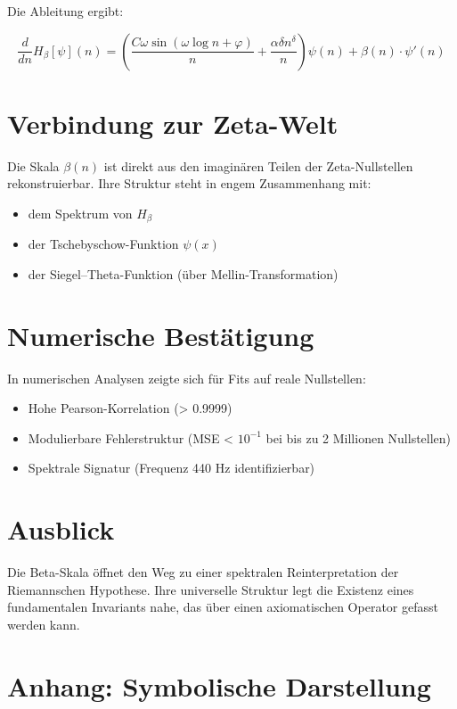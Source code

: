 \documentclass[12pt]{article}
\begin{document}
Die Ableitung ergibt:

\begin{equation}
\frac{d}{dn} H_\beta[\psi](n) = \left( \frac{C \omega \sin(\omega \log n + \varphi)}{n} + \frac{\alpha \delta n^\delta}{n} \right) \psi(n) + \beta(n) \cdot \psi'(n)
\end{equation}

\section{Verbindung zur Zeta-Welt}

Die Skala $\beta(n)$ ist direkt aus den imaginären Teilen der Zeta-Nullstellen rekonstruierbar. Ihre Struktur steht in engem Zusammenhang mit:

\begin{itemize}
  \item dem Spektrum von $H_\beta$
  \item der Tschebyschow-Funktion $\psi(x)$
  \item der Siegel–Theta-Funktion (über Mellin-Transformation)
\end{itemize}

\section{Numerische Bestätigung}

In numerischen Analysen zeigte sich für Fits auf reale Nullstellen:

\begin{itemize}
  \item Hohe Pearson-Korrelation (> 0.9999)
  \item Modulierbare Fehlerstruktur (MSE < $10^{-1}$ bei bis zu 2 Millionen Nullstellen)
  \item Spektrale Signatur (Frequenz 440 Hz identifizierbar)
\end{itemize}

\section{Ausblick}

Die Beta-Skala öffnet den Weg zu einer spektralen Reinterpretation der Riemannschen Hypothese. Ihre universelle Struktur legt die Existenz eines fundamentalen Invariants nahe, das über einen axiomatischen Operator gefasst werden kann.

\section*{Anhang: Symbolische Darstellung}
\end{document}
